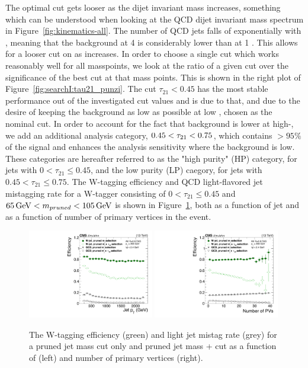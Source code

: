 The optimal cut gets looser as the dijet invariant mass increases, something which can be understood when looking at the QCD dijet invariant mass spectrum in Figure~\ref{fig:kinematics-all}. The number of QCD jets falls of exponentially with \mjj, meaning that the background at 4 \TeV is considerably lower than at 1 \TeV. This allows for a looser cut on \nsubj as \mjj increases. In order to choose a single cut which works reasonably well for all masspoints, we look at the ratio of a given \nsubj cut over the significance of the best cut at that mass points. This is shown in the right plot of Figure~\ref{fig:searchI:tau21_punzi}. The cut $\tau_{21}<0.45$ has the most stable performance out of the investigated cut values and is due to that, and due to the desire of keeping the background as low as possible at low \mjj, chosen as the nominal cut. In order to account for the fact that background is lower at high-\mjj, we add an additional analysis category, $0.45 < \tau_{21} < 0.75$, which contains $>95\%$ of the signal and enhances the analysis sensitivity where the background is low.
These categories are hereafter referred to as the "high purity" (HP) category, for jets with $0<\tau_{21} \leq 0.45$, and the low purity (LP) caegory, for jets with $0.45<\tau_{21}\leq0.75$.
\newline
\newline
The W-tagging efficiency and QCD light-flavored jet mistagging rate for a W-tagger consisting of $0<\tau_{21} \leq 0.45$ and  $65 \,\text{Ge\hspace{-.08em}V} < m_{pruned} < 105 \,\text{Ge\hspace{-.08em}V}$ is shown in Figure~\ref{fig:searchI:wtageff}, both as a function of jet \PT and as a function of number of primary vertices in the event.


\begin{figure}[h]
\begin{center}
\includegraphics[width=0.49\textwidth]{figures/analysis/search1/misc/WtagSigEff_vpT_pruned.pdf}
\includegraphics[width=0.49\textwidth]{figures/analysis/search1/misc/WtagSigEff_vnPVs_pruned.pdf}
\caption{The W-tagging efficiency (green) and light jet mistag rate (grey) for a pruned jet mass cut only and pruned jet mass + \nsubj cut as a function of \PT (left) and number of primary vertices (right). }
\label{fig:searchI:wtageff}
\end{center}
\end{figure}


